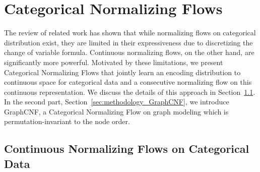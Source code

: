\section{Categorical Normalizing Flows}
\label{sec:methodology}

The review of related work has shown that while normalizing flows on categorical distribution exist, they are limited in their expressiveness due to discretizing the change of variable formula.
Continuous normalizing flows, on the other hand, are significantly more powerful.
Motivated by these limitations, we present Categorical Normalizing Flows that jointly learn an encoding distribution to continuous space for categorical data and a consecutive normalizing flow on this continuous representation.
We discuss the details of this approach in Section~\ref{sec:methodology_CNF}.
In the second part, Section~\ref{sec:methodology_GraphCNF}, we introduce GraphCNF, a Categorical Normalizing Flow on graph modeling which is permutation-invariant to the node order. 

\subsection{Continuous Normalizing Flows on Categorical Data}
\label{sec:methodology_CNF}

